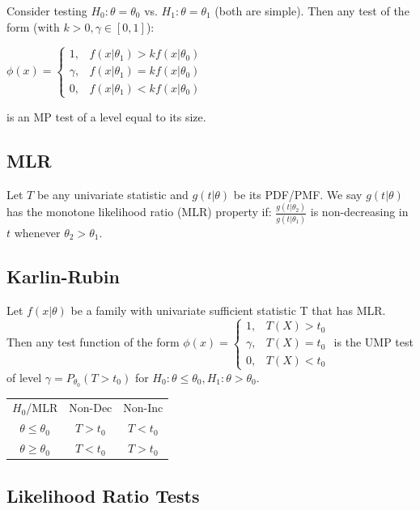 \documentclass{article}
\begin{document}
Consider testing $H_0:\theta = \theta_0$ vs. $H_1: \theta = \theta_1$ (both are simple). Then any test of the form (with $k > 0, \gamma \in [0,1]$):

$\phi(x) = \begin{cases} 1, & f(x|\theta_1) > kf(x|\theta_0) \\ \gamma, & f(x|\theta_1) = kf(x|\theta_0) \\ 0, & f(x|\theta_1) < kf(x|\theta_0) \end{cases}$

is an MP test of a level equal to its size. 

\subsection{MLR}

Let $T$ be any univariate statistic and $g(t|\theta)$ be its PDF/PMF. We say $g(t|\theta)$ has the monotone likelihood ratio (MLR) property if: $\frac{g(t|\theta_2)}{g(t|\theta_1)}$ is non-decreasing in $t$ whenever $\theta_2 > \theta_1$.

\subsection{Karlin-Rubin}

Let $f(x|\theta)$ be a family with univariate sufficient statistic T that has MLR. Then any test function of the form $\phi(x) = \begin{cases} 1, & T(X) > t_0 \\ \gamma, & T(X) = t_0 \\ 0, & T(X) < t_0 \end{cases}$ is the UMP test of level $\gamma = P_{\theta_0}(T > t_0)$ for $H_0: \theta \le \theta_0, H_1: \theta > \theta_0$.

\begin{center}
\begin{tabular}{ c c c }
 $H_0$/MLR & Non-Dec & Non-Inc \\ 
 $\theta \le \theta_0$ & $T > t_0$ & $T < t_0$ \\  
 $\theta \ge \theta_0$ & $T < t_0$ & $T > t_0$    
\end{tabular}
\end{center}

\subsection{Likelihood Ratio Tests}
\end{document}
